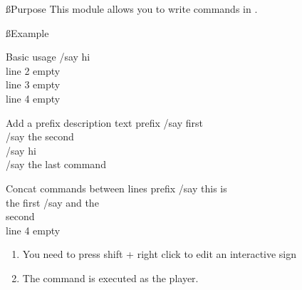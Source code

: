 \ss{Purpose}
This module allows you to write commands in .

\ss{Example}
\begin{example}{Basic usage}
    /say hi \\
    line 2 empty\\
    line 3 empty\\
    line 4 empty
\end{example}

\begin{example}{Add a prefix description text}
    prefix /say first\\
    /say the second\\
    /say hi \\
    /say the last command
\end{example}

\begin{example}{Concat commands between lines}
    prefix /say this is\\
    the first /say and the\\
    second\\
    line 4 empty
\end{example}

\begin{tips}{}
    \begin{enumerate}
        \item You need to press shift + right click to edit an interactive sign
        \item The command is executed as the player.
    \end{enumerate}
    
\end{tips}